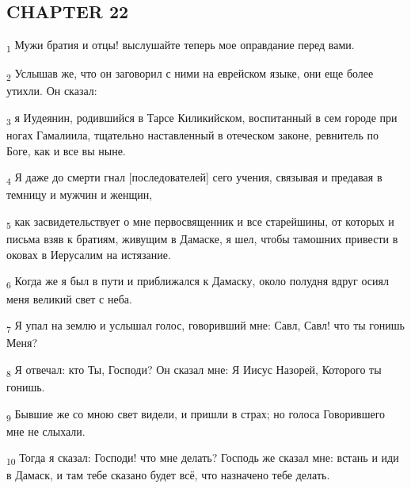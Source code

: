 \subsection{CHAPTER 22}
\begin{tcolorbox}
\textsubscript{1} Мужи братия и отцы! выслушайте теперь мое оправдание перед вами.
\end{tcolorbox}
\begin{tcolorbox}
\textsubscript{2} Услышав же, что он заговорил с ними на еврейском языке, они еще более утихли. Он сказал:
\end{tcolorbox}
\begin{tcolorbox}
\textsubscript{3} я Иудеянин, родившийся в Тарсе Киликийском, воспитанный в сем городе при ногах Гамалиила, тщательно наставленный в отеческом законе, ревнитель по Боге, как и все вы ныне.
\end{tcolorbox}
\begin{tcolorbox}
\textsubscript{4} Я даже до смерти гнал [последователей] сего учения, связывая и предавая в темницу и мужчин и женщин,
\end{tcolorbox}
\begin{tcolorbox}
\textsubscript{5} как засвидетельствует о мне первосвященник и все старейшины, от которых и письма взяв к братиям, живущим в Дамаске, я шел, чтобы тамошних привести в оковах в Иерусалим на истязание.
\end{tcolorbox}
\begin{tcolorbox}
\textsubscript{6} Когда же я был в пути и приближался к Дамаску, около полудня вдруг осиял меня великий свет с неба.
\end{tcolorbox}
\begin{tcolorbox}
\textsubscript{7} Я упал на землю и услышал голос, говоривший мне: Савл, Савл! что ты гонишь Меня?
\end{tcolorbox}
\begin{tcolorbox}
\textsubscript{8} Я отвечал: кто Ты, Господи? Он сказал мне: Я Иисус Назорей, Которого ты гонишь.
\end{tcolorbox}
\begin{tcolorbox}
\textsubscript{9} Бывшие же со мною свет видели, и пришли в страх; но голоса Говорившего мне не слыхали.
\end{tcolorbox}
\begin{tcolorbox}
\textsubscript{10} Тогда я сказал: Господи! что мне делать? Господь же сказал мне: встань и иди в Дамаск, и там тебе сказано будет всё, что назначено тебе делать.
\end{tcolorbox}
